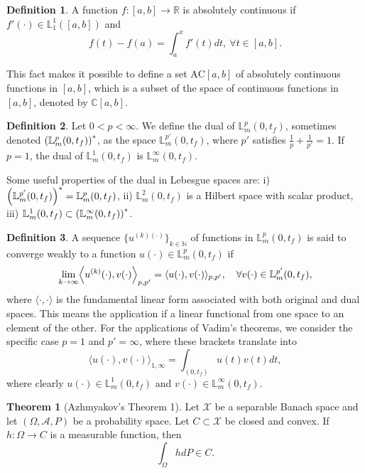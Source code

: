 \documentclass[11pt,letterpaper]{article}
\newcommand{\NN}{{\mathbb{N}}}
\newcommand{\LL}{{\mathbb{L}}}
\newcommand{\RR}{{\mathbb{R}}}
\newcommand{\CC}{{\mathbb{C}}}
\newcommand{\A}{{\mathcal{A}}}
\newcommand{\X}{{\mathcal{X}}}
\let\originalleft\left
\let\originalright\right
\renewcommand{\left}{\mathopen{}\mathclose\bgroup\originalleft}
\renewcommand{\right}{\aftergroup\egroup\originalright}
\theoremstyle{definition}
\newtheorem{definition}{Definition}[section]
\newtheorem{theorem}{Theorem}[section]
\begin{document}
\begin{definition}
A function $f:[a,b]\rightarrow\RR$ is absolutely continuous if $f'(\cdot)\in\LL_1^1([a,b])$ and 
\begin{equation}
    f(t)-f(a)=\int_a^xf'(t)dt,\ \forall t\in[a,b].
\end{equation}
\end{definition}
This fact makes it possible to define a set $\mathrm{AC}[a,b]$ of absolutely continuous functions in $[a,b]$, which is a subset of the space of continuous functions in $[a,b]$, denoted by $\CC[a,b]$.
\begin{definition}
Let $0<p<\infty$. We define the dual of $\LL_m^p(0,t_f)$, sometimes denoted $\left(\LL_m^p(0,t_f)\right)^*$, as the space $\LL_m^{p'}(0,t_f)$, where $p'$ satisfies $\frac{1}{p} + \frac{1}{p'}=1$. If $p=1$, the dual of $\LL_m^1(0,t_f)$ is $\LL^\infty_m(0,t_f)$.
\end{definition}
Some useful properties of the dual in Lebesgue spaces are: i) $\left(\LL_m^{p'}(0,t_f)\right)^*=\LL^p_m(0,t_f)$, ii) $\LL^2_m(0,t_f)$ is a Hilbert space with scalar product, iii) $\LL^1_m(0,t_f)\subset\left(\LL_m^\infty(0,t_f)\right)^*$.

\begin{definition}
A sequence $\{u^{(k)(\cdot)}\}_{k\in\NN}$ of functions in $\LL^p_m(0,t_f)$ is said to converge weakly to a function $u(\cdot)\in\LL^p_m(0,t_f)$ if
\begin{equation}
    \lim_{k\rightarrow\infty}\left\langle u^{(k)}(\cdot),v(\cdot)\right\rangle_{p,p'}=\langle u(\cdot),v(\cdot)\rangle_{p,p'},\quad\forall v(\cdot)\in\LL_m^{p'}(0,t_f),
\end{equation}
where $\langle\cdot,\cdot\rangle$ is the fundamental linear form associated with both original and dual spaces. This means the application if a linear functional from one space to an element of the other. For the applications of Vadim's theorems, we consider the specific case $p=1$ and $p'=\infty$, where these brackets translate into
\begin{equation}
    \langle u(\cdot),v(\cdot)\rangle_{1,\infty}=\int_{(0,t_f)}u(t)v(t)dt,
\end{equation}
where clearly $u(\cdot)\in\LL_m^1(0,t_f)$ and $v(\cdot)\in\LL^\infty_m(0,t_f)$.
\end{definition}

\begin{theorem}[Azhmyakov's Theorem 1]\label{th:1}
Let $\X$ be a separable Banach space and let $(\Omega,\A,P)$ be a probability space. Let $C\subset\X$ be closed and convex. If $h:\Omega\rightarrow C$ is a measurable function, then 
\begin{equation}
\int_\Omega hdP\in C.
\end{equation}
\end{theorem}
\end{document}
